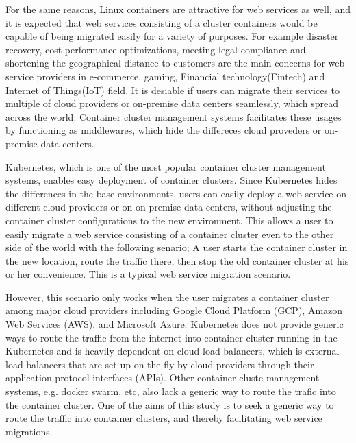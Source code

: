 For the same reasons, Linux containers are attractive for web services as well, and it is expected that web services consisting of a cluster containers would be capable of being migrated easily for a variety of purposes.
For example disaster recovery, cost performance optimizations, meeting legal compliance and shortening the geographical distance to customers are the main concerns for web service providers in e-commerce, gaming, Financial technology(Fintech) and Internet of Things(IoT) field.
%
It is desiable if users can migrate their services to multiple of cloud providers or on-premise data centers seamlessly, which spread across the world.
Container cluster management systems facilitates these usages by functioning as middlewares, which hide the differeces cloud proveders or on-premise data centers.

Kubernetes\cite{K8s2017}, which is one of the most popular container cluster management systems, enables easy deployment of container clusters.
Since Kubernetes hides the differences in the base environments, users can easily deploy a web service on different cloud providers or on on-premise data centers, without adjusting the container cluster configurations to the new environment. 
This allows a user to easily migrate a web service consisting of a container cluster even to the other side of the world with the following senario; 
A user starts the container cluster in the new location, route the traffic there, then stop the old container cluster at his or her convenience.
This is a typical web service migration scenario.

However, this scenario only works when the user migrates a container cluster among major cloud providers including Google Cloud Platform (GCP), Amazon Web Services (AWS), and Microsoft Azure.
Kubernetes does not provide generic ways to route the traffic from the internet into container cluster running in the Kubernetes and is heavily dependent on cloud load balancers, which is external load balancers that are set up on the fly by cloud providers through their application protocol interfaces (APIs).
Other container cluste management systems, e.g. docker swarm, etc, also lack a generic way to route the trafic into the container cluster.
One of the aims of this study is to seek a generic way to route the traffic into container clusters, and thereby facilitating web service migrations.

